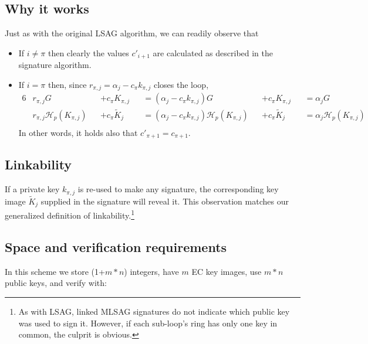 \subsection*{Why it works}

Just as with the original LSAG algorithm, we can readily observe that

\begin{itemize}

\item If \(i \ne \pi \) then clearly the values \(c'_{i + 1}\) are calculated as described in the signature algorithm.

\item If \(i = \pi\) then, since \(r_{\pi, j} = \alpha_j - c_\pi k_{\pi, j} \) closes the loop,\\
\begin{alignat*}{6}  
  &r_{\pi, j} G &&+ c_\pi K_{\pi,j}                              
                   &&= (\alpha_j - c_\pi k_{\pi, j}) G &&+ c_\pi K_{\pi,j}
                   &&= \alpha_j G \\  
  &r_{\pi, j} \mathcal{H}_p(K_{\pi, j}) &&+ c_\pi \tilde{K}_j  
                   &&= (\alpha_j - c_\pi k_{\pi, j}) \mathcal{H}_p(K_{\pi, j}) &&+ c_\pi \tilde{K}_j
                   &&= \alpha_j \mathcal{H}_p(K_{\pi, j})\\ 
\end{alignat*}
   In other words, it holds also that \(c'_{\pi + 1} = c_{\pi+1}\).

\end{itemize}


\subsection*{Linkability}

If a private key \(k_{\pi, j}\) is re-used to make any signature, the corresponding key image \(\tilde{K}_j\) supplied in the signature will reveal it. This observation matches our generalized definition of linkability.\footnote{As with LSAG, linked MLSAG signatures do not indicate which public key was used to sign it. However, if each sub-loop's ring has only one key in common, the culprit is obvious.}


\subsection*{Space and verification requirements}

In this scheme we store (1+$m*n$) integers, have $m$ EC key images, use $m*n$ public keys, and verify with:

